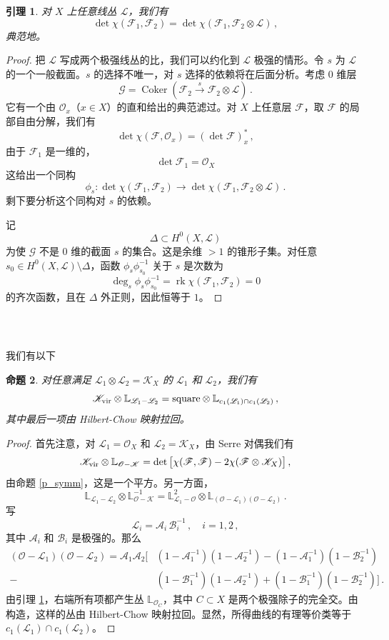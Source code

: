 \documentclass[12pt]{article}
\newcommand{\cO}{\mathscr{O}}
\newcommand{\cL}{\mathscr{L}}
\newcommand{\cA}{\mathscr{A}}
\newcommand{\cB}{\mathscr{B}}
\newcommand{\Kvir}{\mathscr{K}_{\textup{vir}}}
\DeclareMathOperator{\Coker}{Coker}
\DeclareMathOperator{\rk}{rk}
\newcommand{\bL}{\mathbb{L}}
\newcommand{\cF}{\mathscr{F}}
\newcommand{\cG}{\mathscr{G}}
\newcommand{\cK}{\mathscr{K}}
\newtheorem{Lemma}{引理}[section]
\newtheorem{Proposition}[Lemma]{命题}
\theoremstyle{definition}
\begin{document}
\begin{Lemma}\label{l_otimesL}
对 $X$ 上任意线丛 $\cL$，我们有
$$
\det \chi(\cF_1,\cF_2) = \det \chi(\cF_1,\cF_2\otimes \cL)\,,
$$
典范地。
\end{Lemma}

\begin{proof}
把 $\cL$ 写成两个极强线丛的比，我们可以约化到 $\cL$ 极强的情形。令 $s$ 为 $\cL$ 的一个一般截面。$s$ 的选择不唯一，对 $s$ 选择的依赖将在后面分析。考虑 $0$ 维层
$$
\cG = \Coker \left(\cF_2 \xrightarrow{s} \cF_2 \otimes \cL\right) \,.
$$
它有一个由 $\cO_x$（$x\in X$）的直和给出的典范滤过。对 $X$ 上任意层 $\cF$，取 $\cF$ 的局部自由分解，我们有
$$
\det \chi(\cF,\cO_x) = \left(\det \cF\right)^*_x \,,
$$
由于 $\cF_1$ 是一维的，
$$
\det \cF_1 = \cO_X
$$
这给出一个同构
$$
\phi_s: \det \chi(\cF_1,\cF_2)  \to \det \chi(\cF_1,\cF_2\otimes
\cL)\,.
$$
剩下要分析这个同构对 $s$ 的依赖。

记
$$
\Delta \subset H^0(X,\cL)
$$
为使 $\cG$ 不是 $0$ 维的截面 $s$ 的集合。这是余维 $>1$ 的锥形子集。对任意 $s_0 \in
H^0(X,\cL)\setminus \Delta$，函数 $\phi_s \phi_{s_0}^{-1}$ 关于 $s$ 是次数为
$$
\deg_s \phi_s \phi_{s_0}^{-1}  = \rk \chi(\cF_1,\cF_2) = 0
$$
的齐次函数，且在 $\Delta$ 外正则，因此恒等于 $1$。
\end{proof}

\subsubsection{\ }\label{pull_square}

我们有以下

\begin{Proposition}\label{p_Ksquare}
对任意满足 $\cL_1\otimes \cL_2 =
\cK_X$ 的 $\cL_1$ 和 $\cL_2$，我们有
$$
\Kvir \otimes \bL_{\cL_1-\cL_2} = \textup{square} \otimes
\bL_{c_1(\cL_1) \cap c_1(\cL_2)} \,,
$$
其中最后一项由 Hilbert-Chow 映射拉回。
\end{Proposition}

\begin{proof}
首先注意，对 $\cL_1=\cO_X$ 和 $\cL_2=\cK_X$，由 Serre 对偶我们有
$$
   \Kvir \otimes \bL_{\cO-\cK} = \det
\big[ \chi(\cF,\cF) - 2 \chi(\cF\otimes \cK_X)
\big] \,,
$$
由命题 \ref{p_symm}，这是一个平方。另一方面，
$$
\bL_{\cL_1-\cL_2} \otimes \bL_{\cO-\cK}^{-1} =
\bL_{\cL_1-\cO}^2  \otimes \bL_{(\cO-\cL_1)(\cO-\cL_2)} \,.
$$
写
$$
\cL_i = \cA_i \, \cB_i^{-1}\,, \quad i=1,2\,,
$$
其中 $\cA_i$ 和 $\cB_i$ 是极强的。那么
\begin{align*}
(\cO-\cL_1)(\cO-\cL_2) = \cA_1 \cA_2 \Big[
&(1-\cA_1^{-1})(1-\cA_2^{-1}) - (1-\cA_1^{-1})(1-\cB_2^{-1})\\
-&(1-\cB_1^{-1})(1-\cA_2^{-1}) + (1-\cB_1^{-1})(1-\cB_2^{-1}) \Big]
\,.
\end{align*}
由引理 \ref{l_otimesL}，右端所有项都产生丛 $\bL_{\cO_C}$，其中 $C\subset X$ 是两个极强除子的完全交。由构造，这样的丛由 Hilbert-Chow 映射拉回。显然，所得曲线的有理等价类等于 $c_1(\cL_1) \cap c_1(\cL_2)$。
\end{proof}
\end{document}
